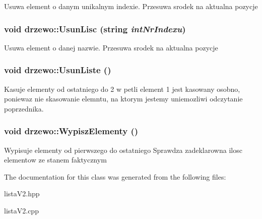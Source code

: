 Usuwa element o danym unikalnym indexie. Przesuwa srodek na aktualna pozycje\hypertarget{classdrzewo_a05086f97ce01ade43dc3ff7a441d9f55}{
\subsubsection[{UsunLisc}]{\setlength{\rightskip}{0pt plus 5cm}void drzewo::UsunLisc (string {\em intNrIndexu})}}
\label{classdrzewo_a05086f97ce01ade43dc3ff7a441d9f55}


Usuwa element o danej nazwie. Przesuwa srodek na aktualna pozycje\hypertarget{classdrzewo_aae2e7025da136b328c490706677a66b5}{
\subsubsection[{UsunListe}]{\setlength{\rightskip}{0pt plus 5cm}void drzewo::UsunListe ()}}
\label{classdrzewo_aae2e7025da136b328c490706677a66b5}


Kasuje elementy od ostatniego do 2 w petli element 1 jest kasowany osobno, poniewaz nie skasowanie elemntu, na ktorym jestemy uniemozliwi odczytanie poprzednika. \hypertarget{classdrzewo_a42f04ceb16b668eb4c326d70753249c1}{
\subsubsection[{WypiszElementy}]{\setlength{\rightskip}{0pt plus 5cm}void drzewo::WypiszElementy ()}}
\label{classdrzewo_a42f04ceb16b668eb4c326d70753249c1}


Wypisuje elementy od pierwszego do ostatniego Sprawdza zadeklarowna ilosc elementow ze stanem faktycznym

The documentation for this class was generated from the following files:\begin{DoxyCompactItemize}
\item 
listaV2.hpp\item 
listaV2.cpp\end{DoxyCompactItemize}
